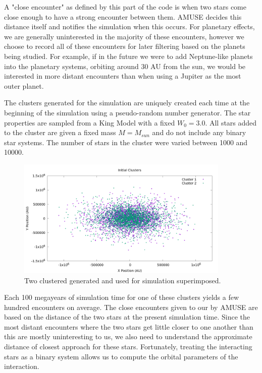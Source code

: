 \documentclass[12pt]{article}
\begin{document}
    A "close encounter" as defined by this part of the code is when two stars
    come close enough to have a strong encounter between them. AMUSE decides
    this distance itself and notifies the simulation when this occurs. For planetary
    effects, we are generally uninterested in the majority of these encounters, however
    we choose to record all of these encounters for later filtering based on the
    planets being studied. For example, if in the future we were to add Neptune-like
    planets into the planetary systems, orbiting around 30 AU from the sun, we would
    be interested in more distant encounters than when using a Jupiter as the most
    outer planet.

    The clusters generated for the simulation are uniquely created each time at the
    beginning of the simulation using a pseudo-random number generator. 
    The star properties are sampled from a
    King Model with a fixed $W_0=3.0$. %
    All stars added to the cluster are given a fixed mass $M=M_{sun}$ and do not
    include any binary star systems. The number
    of stars in the cluster were varied between 1000 and 10000. 

    \begin{figure}
        \centering
        \caption{Two clustered generated and used for simulation superimposed.}
        \includegraphics[width=4.0in]{cluster_superimposed.png}
    \end{figure}

    Each 100 megayears of simulation time for one of these clusters yields a
    few hundred encounters on average. The close encounters given to our by 
    AMUSE are based on the distance of the two stars at the present simulation time.
    Since the most distant encounters where the two stars get little closer to one
    another than this are mostly uninteresting to us, we also need to understand
    the approximate distance of closest approach for these stars. Fortunately, treating
    the interacting stars as a binary system allows us to compute the orbital parameters
    of the interaction. 
\end{document}

